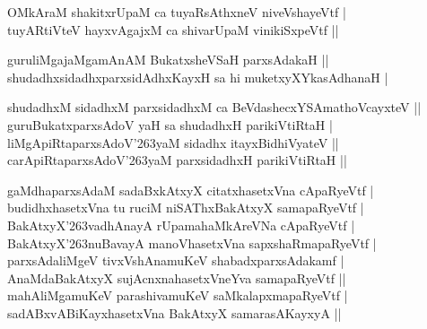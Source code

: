 \begin{entry}
\begin{shl}
OMkAraM shakitxrUpaM ca tuyaRsAthxneV niveVshayeVtf |\\[2pt]
tuyARtiVteV hayxvAgajxM ca shivarUpaM vinikiSxpeVtf ||\\[-1pt]
\end{shl}
\medskip
{}
\smallskip
{}
\medskip
\begin{shl}
guruliMgajaMgamAnAM BukatxsheVSaH parxsAdakaH ||\\[2pt]
shudadhxsidadhxparxsidAdhxKayxH sa hi muketxyXYkasAdhanaH |\\[-1pt]
\end{shl}
\medskip
{}
\medskip
\begin{shl}
shudadhxM sidadhxM parxsidadhxM ca BeVdashecxYSAmathoVcayxteV ||\\[2pt]
guruBukatxparxsAdoV yaH sa shudadhxH parikiVtiRtaH |\\[2pt]
liMgApiRtaparxsAdoV{\char'263}yaM sidadhx itayxBidhiVyateV ||\\[2pt]
carApiRtaparxsAdoV{\char'263}yaM parxsidadhxH parikiVtiRtaH ||\\[-1pt]
\end{shl}
\medskip
{}
\smallskip
{}
\medskip
\begin{shl}
gaMdhaparxsAdaM sadaBxkAtxyX citatxhasetxVna cApaRyeVtf |\\[2pt]
budidhxhasetxVna tu ruciM niSAThxBakAtxyX samapaRyeVtf |\\[2pt]
BakAtxyX{\char'263}vadhAnayA rUpamahaMkAreVNa cApaRyeVtf |\\[2pt]
BakAtxyX{\char'263}nuBavayA manoVhasetxVna sapxshaRmapaRyeVtf |\\[2pt]
parxsAdaliMgeV tivxVshAnamuKeV shabadxparxsAdakamf |\\[2pt]
AnaMdaBakAtxyX sujAcnxnahasetxVneYva samapaRyeVtf ||\\[2pt]
mahAliMgamuKeV parashivamuKeV saMkalapxmapaRyeVtf |\\[2pt]
sadABxvABiKayxhasetxVna BakAtxyX samarasAKayxyA ||\\[-1pt]
\end{shl}

\end{entry}
